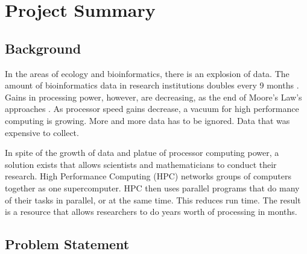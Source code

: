 

 


\section{Project Summary}

\subsection{Background}

In the areas of ecology and bioinformatics, there is an explosion of data. The
amount of bioinformatics data in research institutions doubles every 9 months 
\cite{james}. Gains in processing power, however, are decreasing, as the end
of Moore's Law's approaches \cite{gordon_moore}. As processor speed gains decrease, 
a vacuum for high performance computing is growing. More and more data has 
to be ignored. Data that was expensive to collect.

In spite of the growth of data and platue of processor computing power, a 
solution exists that allows scientists and mathematicians to conduct their 
research. High Performance Computing (HPC) networks groups of computers 
together as one supercomputer. HPC then uses parallel programs that do many 
of their tasks in parallel, or at the same time. This reduces run time. 
The result is a resource that allows researchers to do years worth of 
processing in months.

\subsection{Problem Statement}

